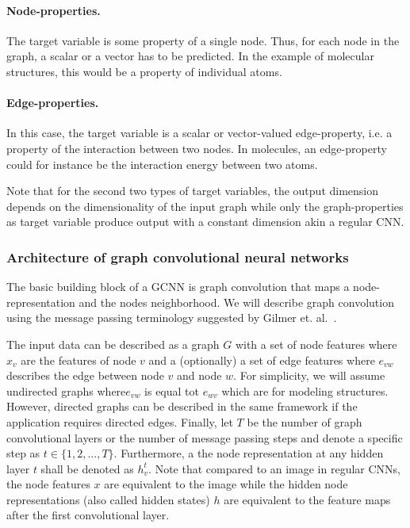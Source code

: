 \paragraph{Node-properties.}
The target variable is some property of a single node. Thus, for each node in the graph, a scalar or a vector has to be predicted. In the example of molecular structures, this would be a property of individual atoms.
\paragraph{Edge-properties.}
In this case, the target variable is a scalar or vector-valued edge-property, i.e. a property of the interaction between two nodes. In molecules, an edge-property could for instance be the interaction energy between two atoms.

Note that for the second two types of target variables, the output dimension depends on the dimensionality of the input graph while only the graph-properties as target variable produce output with a constant dimension akin a regular CNN.

\subsubsection{Architecture of graph convolutional neural networks}


The basic building block of a GCNN is graph convolution that maps a node-representation and the nodes neighborhood. We will describe graph convolution using the message passing terminology suggested by Gilmer et. al.~\cite{Gilmer2017}.

The input data can be described as a graph $G$ with	a set of node features where $x_v$ are the features of node $v$ and a (optionally) a set of edge features where $e_{vw}$ describes the edge between node $v$ and node $w$. For simplicity, we will assume undirected graphs where$e_{vw}$ is equal tot $e_{wv}$ which are for modeling structures. However, directed graphs can be described in the same framework if the application requires directed edges. Finally, let $T$ be the number of graph convolutional layers or the number of message passing steps and denote a specific step as $t \in \{1, 2, ..., T\}$. Furthermore, a the node representation at any hidden layer $t$ shall be denoted as $h_v^t$. Note that compared to an image in regular CNNs, the node features $x$ are equivalent to the image while the hidden node representations (also called hidden states) $h$ are equivalent to the feature maps after the first convolutional layer.

